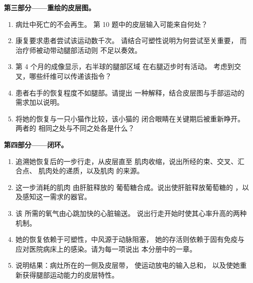 \begin{problem}
\medskip
\noindent\textbf{第三部分——重绘的皮层图。}
\begin{enumerate}[resume]
  \item 病灶中死亡的不会再生。
        第 10 题中的皮层输入可能来自何处？
  \item 康复要求患者尝试该运动数千次。
        请结合可塑性说明为何尝试至关重要，
        而治疗师被动带动腿部活动则
        不足以奏效。
  \item 第 4 个月的成像显示，右半球的腿部区域
        在右腿迈步时有活动。
        考虑到交叉，哪些纤维可以传递该指令？
  \item 患者右手的恢复程度不如腿部。请提出
        一种解释，结合皮层图与手部运动的
        需求加以说明。
  \item 将她的恢复与一只小猫作比较，该小猫的
        闭合眼睛在关键期后被重新睁开。两者的
        相同之处与不同之处各是什么？
\end{enumerate}

\medskip
\noindent\textbf{第四部分——闭环。}
\begin{enumerate}[resume]
  \item 追溯她恢复后的一步行走，从皮层直至
        肌肉收缩，说出所经的束、交叉、汇合点、
        肌肉处的递质，以及肌肉  的来源。
  \item 这一步消耗的肌肉  由肝脏释放的
        葡萄糖合成。说出使肝脏释放葡萄糖的
        ，以及感知这一需求的器官。
  \item 该  所需的氧气由心跳加快的心脏输送。
        说出行走开始时使其心率升高的两种
        机制。
  \item 她的恢复依赖于可塑性，中风源于动脉阻塞，
        她的存活则依赖于固有免疫与
        应对医院病床上的感染。请为每一项说出
        本分册中的一章。
  \item 说明结果：病灶所在的一侧及皮层带，
        使运动放电的输入总和，
        以及使她重新获得腿部运动能力的皮层特性。
\end{enumerate}
\end{problem}
